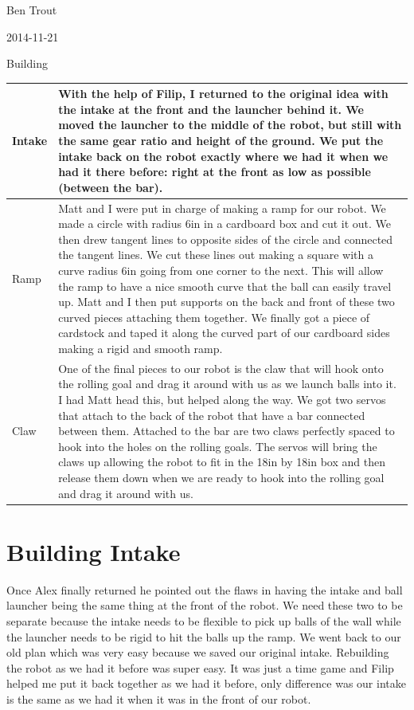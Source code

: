 Ben Trout

2014-11-21

Building  

\begin{tabular}{|p{4cm}|p{6cm}|}
\hline
 Intake&
With the help of Filip, I returned to the original idea with the intake at the front and the launcher behind it. We moved the launcher to the middle of the robot, but still with the same gear ratio and height of the ground. We put the intake back on the robot exactly where we had it when we had it there before: right at the front as low as possible (between the bar).
\\
\hline
Ramp&
Matt and I were put in charge of making a ramp for our robot. We made a circle with radius 6in in a cardboard box and cut it out. We then drew tangent lines to opposite sides of the circle and connected the tangent lines. We cut these lines out making a square with a curve radius 6in going from one corner to the next. This will allow the ramp to have a nice smooth curve that the ball can easily travel up. Matt and I then put supports on the back and front of these two curved pieces attaching them together. We finally got a piece of cardstock and taped it along the curved part of our cardboard sides making a rigid and smooth ramp. 
\\
\hline
Claw&
One of the final pieces to our robot is the claw that will hook onto the rolling goal and drag it around with us as we launch balls into it. I had Matt head this, but helped along the way. We got two servos that attach to the back of the robot that have a bar connected between them. Attached to the bar are two claws perfectly spaced to hook into the holes on the rolling goals. The servos will bring the claws up allowing the robot to fit in the 18in by 18in box and then release them down when we are ready to hook into the rolling goal and drag it around with us. 
\\
\hline
\end{tabular}

\section*{Building Intake}
Once Alex finally returned he pointed out the flaws in having the intake and ball launcher being the same thing at the front of the robot. We need these two to be separate because the intake needs to be flexible to pick up balls of the wall while the launcher needs to be rigid to hit the balls up the ramp. We went back to our old plan which was very easy because we saved our original intake. Rebuilding the robot as we had it before was super easy. It was just a time game and Filip helped me put it back together as we had it before, only difference was our intake is the same as we had it when it was in the front of our robot. 


